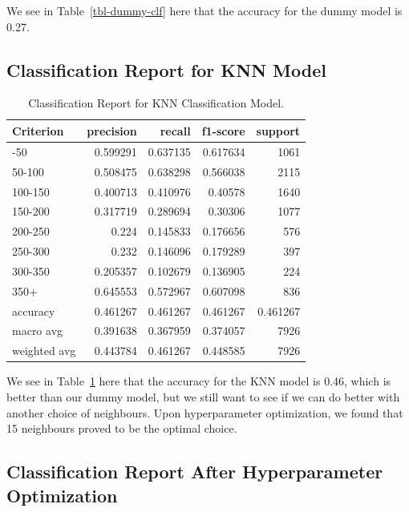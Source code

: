 \documentclass[
  letterpaper,
  DIV=11,
  numbers=noendperiod]{scrartcl}
\begin{document}
We see in Table~\ref{tbl-dummy-clf} here that the accuracy for the dummy
model is 0.27.

\subsection{Classification Report for KNN
Model}\label{classification-report-for-knn-model}

\begin{longtable}[]{@{}lrrrr@{}}

\caption{\label{tbl-knn-clf}Classification Report for KNN Classification
Model.}

\tabularnewline

\toprule\noalign{}
Criterion & precision & recall & f1-score & support \\
\midrule\noalign{}
\endhead
\bottomrule\noalign{}
\endlastfoot
0-50 & 0.599291 & 0.637135 & 0.617634 & 1061 \\
50-100 & 0.508475 & 0.638298 & 0.566038 & 2115 \\
100-150 & 0.400713 & 0.410976 & 0.40578 & 1640 \\
150-200 & 0.317719 & 0.289694 & 0.30306 & 1077 \\
200-250 & 0.224 & 0.145833 & 0.176656 & 576 \\
250-300 & 0.232 & 0.146096 & 0.179289 & 397 \\
300-350 & 0.205357 & 0.102679 & 0.136905 & 224 \\
350+ & 0.645553 & 0.572967 & 0.607098 & 836 \\
accuracy & 0.461267 & 0.461267 & 0.461267 & 0.461267 \\
macro avg & 0.391638 & 0.367959 & 0.374057 & 7926 \\
weighted avg & 0.443784 & 0.461267 & 0.448585 & 7926 \\

\end{longtable}

We see in Table~\ref{tbl-knn-clf} here that the accuracy for the KNN
model is 0.46, which is better than our dummy model, but we still want
to see if we can do better with another choice of neighbours. Upon
hyperparameter optimization, we found that 15 neighbours proved to be
the optimal choice.

\subsection{Classification Report After Hyperparameter
Optimization}\label{classification-report-after-hyperparameter-optimization}
\end{document}

